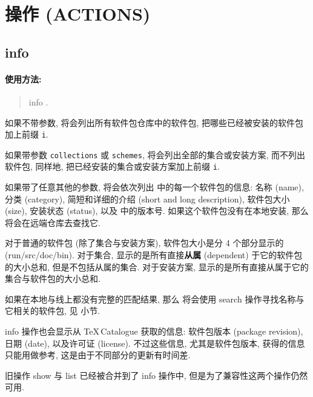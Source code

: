 \section{操作 (ACTIONS)}

\subsection{\mdseries\ac{info}}

\paragraph{使用方法:}


\begin{quote}
    \tlmgr{} \ac{info} .
\end{quote}

如果不带参数, 将会列出所有软件包仓库中的软件包, 把哪些已经被安装的软件包加上前缀 \texttt{i}.

如果带参数 \texttt{collections} 或 \texttt{schemes}, 将会列出全部的集合或安装方案, 而不列出软件包, 同样地, 把已经安装的集合或安装方案加上前缀 \texttt{i}. 

如果带了任意其他的参数, 将会依次列出  中的每一个软件包的信息: 名称 (name), 分类 (category), 简短和详细的介绍 (short and long description), 软件包大小 (size), 安装状态 (status), 以及 \tl 中的版本号. 如果这个软件包没有在本地安装, 那么 \tlmgr 将会在远端仓库去查找它. 

对于普通的软件包 (除了集合与安装方案), 软件包大小是分 4 个部分显示的 (run/src/doc/bin). 对于集合, 显示的是所有直接\textbf{从属} (dependent) 于它的软件包的大小总和, 但是不包括从属的集合. 对于安装方案, 显示的是所有直接从属于它的集合与软件包的大小总和. 

如果在本地与线上都没有完整的匹配结果, 那么 \tlmgr 将会使用 \ac{search} 操作寻找名称与它相关的软件包, 见  小节. 

\ac{info} 操作也会显示从 \TeX\,Catalogue 获取的信息: 软件包版本 (package revision), 日期 (date), 以及许可证 (license). 不过这些信息, 尤其是软件包版本, 获得的信息只能用做参考, 这是由于不同部分的更新有时间差. 

旧操作 \ac{show} 与 \ac{list} 已经被合并到了 \ac{info} 操作中, 但是为了兼容性这两个操作仍然可用. 


